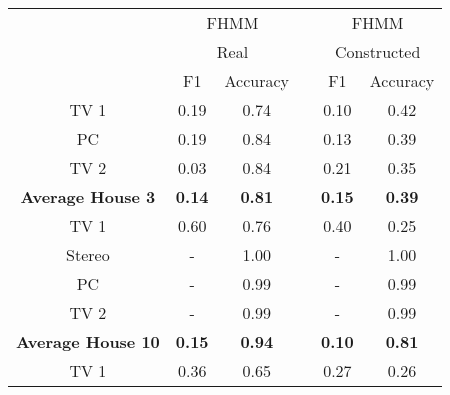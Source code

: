\begin{table}[H]                             
\centering                                   
\begin{tabular}{c|c|c|c|c|c|}  
\cline{2-3}        
\cline{5-6}                               
 & \multicolumn{2}{|c|}{FHMM}& & \multicolumn{2}{c|}{FHMM} \\                      
 & \multicolumn{2}{|c|}{Real}& & \multicolumn{2}{c|}{Constructed} \\                      
\cline{2-3}        
\cline{5-6}                                      
 & F1 & Accuracy & & F1 & Accuracy \\          
\cline{1-3}        
\cline{5-6}                                      
\multicolumn{1}{|c|}{TV 1 }& 0.19 & 0.74 & & 0.10 & 0.42 \\          
\cline{1-3}        
\cline{5-6}                                         
\multicolumn{1}{|c|}{PC }& 0.19 & 0.84 & & 0.13 & 0.39 \\            
\cline{1-3}        
\cline{5-6}                                        
\multicolumn{1}{|c|}{TV 2 }& 0.03 & 0.84 & & 0.21 & 0.35 \\          
\cline{1-3}        
\cline{5-6}                                        
\multicolumn{1}{|c|}{\textbf{Average House 3 }}& \textbf{0.14} & \textbf{0.81} & &\textbf{0.15} & \textbf{0.39} \\ 
\cline{1-3}        
\cline{5-6}                                         
\multicolumn{1}{|c|}{TV 1} & 0.60 & 0.76 & & 0.40 & 0.25 \\          
\cline{1-3}        
\cline{5-6}                                       
\multicolumn{1}{|c|}{Stereo }& - & 1.00 & & - & 1.00 \\              
\cline{1-3}        
\cline{5-6}                                        
\multicolumn{1}{|c|}{PC }& - & 0.99 & & - & 0.99 \\                  
\cline{1-3}        
\cline{5-6}                                       
\multicolumn{1}{|c|}{TV 2 }& - & 0.99 & & - & 0.99 \\                
\cline{1-3}        
\cline{5-6}                                       
\multicolumn{1}{|c|}{\textbf{Average House 10}} & \textbf{0.15} & \textbf{0.94} & & \textbf{0.10} & \textbf{0.81} \\
\cline{1-3}        
\cline{5-6}                                     
\multicolumn{1}{|c|}{TV 1} & 0.36 & 0.65 & & 0.27 & 0.26 \\          
\cline{1-3}        

\end{tabular}
\end{table}
